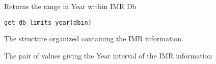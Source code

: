 %
\begin{Description}\relax
Returns the range in Year within IMR Db
\end{Description}
%
\begin{Usage}
\begin{verbatim}
get_db_limits_year(dbin)
\end{verbatim}
\end{Usage}
%
\begin{Arguments}
\begin{ldescription}
\item[\code{dbin}] 
The  structure organized containing the IMR
information.

\end{ldescription}
\end{Arguments}
%
\begin{Value}
The pair of values giving the Year interval of the IMR information
\end{Value}
